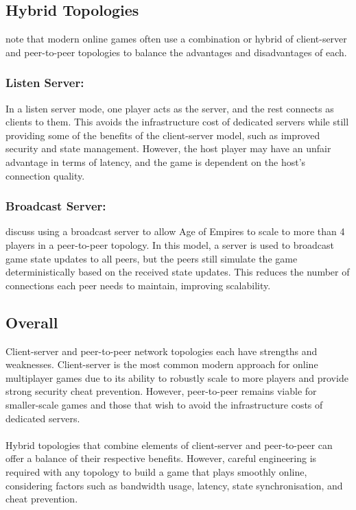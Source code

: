 \subsection{Hybrid Topologies}
\cite{network-architecting} note that modern online games often use a combination or hybrid of client-server and peer-to-peer topologies to balance the advantages and disadvantages of each.
\noindent
\subsubsection{Listen Server:}
In a listen server mode, one player acts as the server, and the rest connects as clients to them. This avoids the infrastructure cost of dedicated servers while still providing some of the benefits of the client-server model, such as improved security and state management. However, the host player may have an unfair advantage in terms of latency, and the game is dependent on the host's connection quality.

\subsubsection{Broadcast Server:}
\cite{bettner20011500} discuss using a broadcast server to allow Age of Empires to scale to more than 4 players in a peer-to-peer topology. In this model, a server is used to broadcast game state updates to all peers, but the peers still simulate the game deterministically based on the received state updates. This reduces the number of connections each peer needs to maintain, improving scalability.

\subsection{Overall}
Client-server and peer-to-peer network topologies each have strengths and weaknesses. Client-server is the most common modern approach for online multiplayer games due to its ability to robustly scale to more players and provide strong security cheat prevention. However, peer-to-peer remains viable for smaller-scale games and those that wish to avoid the infrastructure costs of dedicated servers.
\\
\noindent
\\
Hybrid topologies that combine elements of client-server and peer-to-peer can offer a balance of their respective benefits. However, careful engineering is required with any topology to build a game that plays smoothly online, considering factors such as bandwidth usage, latency, state synchronisation, and cheat prevention.

